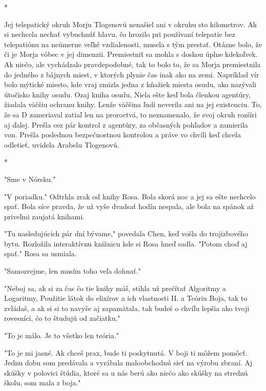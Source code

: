 \documentclass{book}
\begin{document}
\begin{center}

*

\end{center}

Jej telepatický okruh Morju Tlogenovú nenašiel ani v okruhu sto kilometrov. Ak si nechcela nechať vybuchnúť hlavu, čo hrozilo pri používaní telepatie bez telepatiónu na neúmerne veľké vzdialenosti, musela s tým prestať. Otázne bolo, že či je Morja vôbec v jej dimenzii. Premiestniť sa mohla s doskou úplne kdekoľvek. Ak niečo, ale vychádzalo pravdepodobné, tak to bolo to, že sa Morja premiestnila do jedného z bájnych miest, v ktorých plynie čas inak ako na zemi. Napríklad vír bolo mýtické miesto, kde vraj zmizla jedna z kňažiek miesta osudu, ako nazývali útočisko knihy osudu. Ozaj kniha osudu, Niela ešte keď bola členkou agentúry, žiadala väčšiu ochranu knihy. Lenže väčšina ľudí neverila ani na jej existenciu. To, že sa D zameriaval zatiaľ len na proroctvá, to neznamenalo, že svoj okruh rozšíri aj ďalej. Prešla cez pár kontrol z agentúry, za občasných pohľadov a zamierila von. Prešla poslednou bezpečnostnou kontrolou a práve vo chvíli keď chcela odletieť, uvidela Arabelu Tlogenovú.

\begin{center}

*

\end{center}

"$ $Sme v Nórsku."$ $ 

"$ $V poriadku."$ $  Odtrhla zrak od knihy Rosa. Bola skorá noc a jej sa ešte nechcelo spať. Bola síce pravda, že už vyše dvadsať hodín nespala, ale bola na spánok až priveľmi zaujatá knihami.

"$ $Tu nasledujúcich pár dní bývame,"$ $  povedala Chen, keď vošla do trojizbového bytu. Rozložila interaktívnu knižnicu kde si Rosa hneď sadla. "$ $Potom choď aj spať."$ $  Rosa sa usmiala.

"$ $Samozrejme, len musím toho veľa dohnať."$ $ 

"$ $Neboj sa, ak si za čas čo tie knihy máš, stihla už prečítať Algoritmy a Logaritmy, Použitie látok do elixírov a ich vlastnosti II. a Teóriu Boja, tak to zvládaš, a ak si si to navyše aj zapamätala, tak budeš o chvíľu lepšia ako tvoji rovesníci, čo to študujú od začiatku."$ $ 

"$ $To je málo. Je to všetko len teória."$ $ 

"$ $To je mi jasné. Ak chceš prax, bude ti poskytnutá. V boji ti môžem pomôcť. Jednu dobu som predávala a vyrábala maloobchodnú sieť na výrobu zbraní. Aj skúšky v polovici štúdia, ktoré sa u nás berú ako niečo ako skúšky na strednú školu, som mala z boja."$ $ 
\end{document}
